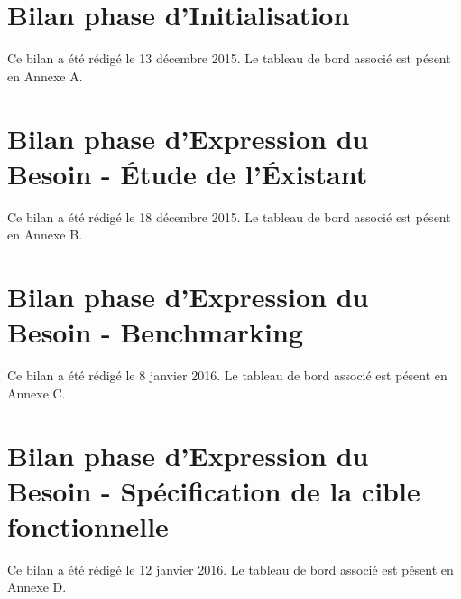 

\newcommand{\mainTitle}{\'Etude préalable - SPIE}
\newcommand{\secondTitle}{Document de suivi}
\newcommand{\documentRef}{TB/4401/1}
\newcommand{\auteurs}{
Paul \textsc{Dautry}
}
\newcommand{\chefDeProjet}{Paul \textsc{Dautry}}
\newcommand{\responsableQualite}{Antoine \textsc{Chabert}}




\newpage

\tableofcontents
\listoffigures
\listoftables
\newpage


\part{Bilan phase d'Initialisation}

Ce bilan a été rédigé le 13 décembre 2015. Le tableau de bord associé est pésent en Annexe A.

\setcounter{section}{0}


\part{Bilan phase d'Expression du Besoin - \'Etude de l'\'Existant}

Ce bilan a été rédigé le 18 décembre 2015. Le tableau de bord associé est pésent en Annexe B.

\setcounter{section}{0}


\part{Bilan phase d'Expression du Besoin - Benchmarking}

Ce bilan a été rédigé le 8 janvier 2016. Le tableau de bord associé est pésent en Annexe C.

\setcounter{section}{0}


\part{Bilan phase d'Expression du Besoin - Spécification de la cible fonctionnelle}

Ce bilan a été rédigé le 12 janvier 2016. Le tableau de bord associé est pésent en Annexe D.

